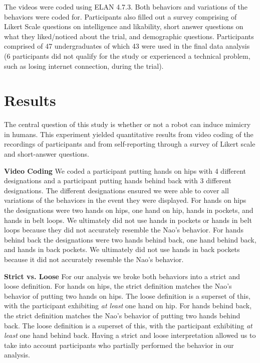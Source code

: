 \documentclass{acm_proc_article-sp}
\begin{document}
The videos were coded using ELAN 4.7.3. Both behaviors and variations of the behaviors were coded for. Participants also filled out a survey comprising of Likert Scale questions on intelligence and likability, short answer questions on what they liked/noticed about the trial, and demographic questions. Participants comprised of 47 undergraduates of which 43 were used in the final data analysis (6 participants did not qualify for the study or experienced a technical problem, such as losing internet connection, during the trial).

\section{Results}
The central question of this study is whether or not a robot can induce mimicry in humans. This experiment yielded quantitative results from video coding of the recordings of participants and from self-reporting through a survey of Likert scale and short-answer questions. 

\textbf{Video Coding} We coded a participant putting hands on hips with 4 different designations and a participant putting hands behind back with 3 different designations. The different designations ensured we were able to cover all variations of the behaviors in the event they were displayed. For hands on hips the designations were two hands on hips, one hand on hip, hands in pockets, and hands in belt loops. We ultimately did not use hands in pockets or hands in belt loops because they did not accurately resemble the Nao's behavior. For hands behind back the designations were two hands behind back, one hand behind back, and hands in back pockets. We ultimately did not use hands in back pockets because it did not accurately resemble the Nao's behavior.
	
\textbf{Strict vs. Loose} For our analysis we broke both behaviors into a strict and loose definition. For hands on hips, the strict definition matches the Nao's behavior of putting two hands on hips. The loose definition is a superset of this, with the participant exhibiting \textit{at least} one hand on hip. For hands behind back, the strict definition matches the Nao's behavior of putting two hands behind back. The loose definition is a superset of this, with the participant exhibiting \textit{at least} one hand behind back. Having a strict and loose interpretation allowed us to take into account participants who partially performed the behavior in our analysis. 
\end{document}
